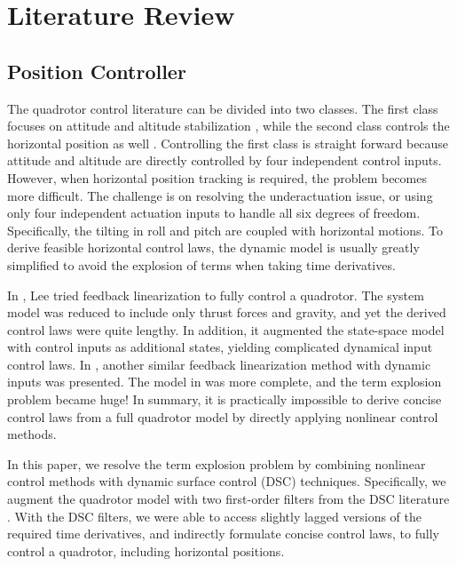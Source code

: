 \documentclass[journal,11pt,onecolumn,draftclsnofoot,]{IEEEtran}
\begin{document}
\section{\textbf{Literature Review}}

\subsection{Position Controller} \label{sec:pos_ctrl}

The quadrotor control literature can be divided into two classes. The first class focuses on attitude and altitude stabilization \cite{bouabdallah2004pid, li2011dynamic, madani2006backstepping_2, bouabdallah2005backstepping, bouadi2011adaptive}, while the second class controls the horizontal position as well \cite{lee2009feedback, xu2006sliding, taniguchi2014quadrotor}. Controlling the first class is straight forward because attitude and altitude are directly controlled by four independent control inputs. However, when horizontal position tracking is required, the problem becomes more difficult. The challenge is on resolving the underactuation issue, or using only four independent actuation inputs to handle all six degrees of freedom. Specifically, the tilting in roll and pitch are coupled with horizontal motions. To derive feasible horizontal control laws, the dynamic model is usually greatly simplified \cite{lee2009feedback, xu2006sliding} to avoid the explosion of terms when taking time derivatives.

In \cite{lee2009feedback}, Lee tried feedback linearization to fully control a quadrotor. The system model was reduced to include only thrust forces and gravity, and yet the derived control laws were quite lengthy. In addition, it augmented the state-space model with control inputs as additional states, yielding complicated dynamical input control laws. In \cite{taniguchi2014quadrotor}, another similar feedback linearization method with dynamic inputs was presented. The model in \cite{taniguchi2014quadrotor} was more complete, and the term explosion problem became huge! In summary, it is practically impossible to derive concise control laws from a full quadrotor model by directly applying nonlinear control methods.

In this paper, we resolve the term explosion problem by combining nonlinear control methods with dynamic surface control (DSC) techniques. Specifically, we augment the quadrotor model with two first-order filters from the DSC literature \cite{song2011dynamic}. With the DSC filters, we were able to access slightly lagged versions of the required time derivatives, and indirectly formulate concise control laws, to fully control a quadrotor, including horizontal positions.
\end{document}
